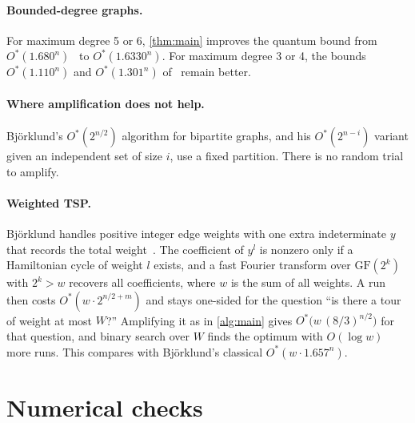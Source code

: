 \documentclass[11pt,a4paper]{article}
\theoremstyle{plain}
\theoremstyle{remark}
\newcommand{\Ostar}{O^{*}}
\newcommand{\GF}{\mathrm{GF}}
\begin{document}
\paragraph{Bounded-degree graphs.}
For maximum degree 5 or 6, \cref{thm:main} improves the quantum bound from $\Ostar(1.680^n)$~\cite{mlm} to $\Ostar(1.6330^n)$. For maximum degree 3 or 4, the bounds $\Ostar(1.110^n)$ and $\Ostar(1.301^n)$ of~\cite{mlm} remain better.

\paragraph{Where amplification does not help.}
Björklund's $\Ostar(2^{n/2})$ algorithm for bipartite graphs, and his $\Ostar(2^{n-i})$ variant given an independent set of size $i$, use a fixed partition. There is no random trial to amplify.

\paragraph{Weighted TSP.}
Björklund handles positive integer edge weights with one extra indeterminate $y$ that records the total weight~\cite[\S 5]{bjorklund}. The coefficient of $y^l$ is nonzero only if a Hamiltonian cycle of weight $l$ exists, and a fast Fourier transform over $\GF(2^k)$ with $2^k > w$ recovers all coefficients, where $w$ is the sum of all weights. A run then costs $\Ostar(w\cdot 2^{n/2+m})$ and stays one-sided for the question ``is there a tour of weight at most $W$?'' Amplifying it as in \cref{alg:main} gives $\Ostar\big(w\,(8/3)^{n/2}\big)$ for that question, and binary search over $W$ finds the optimum with $O(\log w)$ more runs. This compares with Björklund's classical $\Ostar(w\cdot 1.657^n)$.

\section{Numerical checks}\label{sec:numerics}
\end{document}
